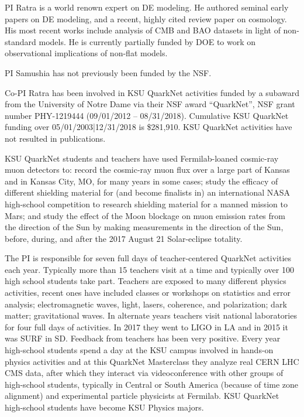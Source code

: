 PI Ratra is a world renown expert on DE modeling. He authored seminal early
papers on DE modeling, and a recent, highly cited review paper on cosmology.
His most recent works include analysis of CMB and BAO datasets in light of
non-standard models. He is currently partially funded by DOE to work on
observational implications of non-flat models.


PI Samushia has not previously been funded by the NSF.

Co-PI Ratra has been involved in  KSU QuarkNet activities funded by a subaward
from the University of Notre Dame via their NSF award ``QuarkNet'', NSF grant
number PHY-1219444 (09/01/2012 -- 08/31/2018).  Cumulative KSU QuarkNet funding
over 05/01/2003|12/31/2018 is \$281,910. KSU QuarkNet activities have not
resulted in publications. 

KSU QuarkNet students and teachers have used Fermilab-loaned cosmic-ray muon
detectors to: record the cosmic-ray muon flux over a large part of Kansas and
in Kansas City, MO, for many years in some cases; study the efficacy of
different shielding material for (and become finalists in) an international
NASA high-school competition to research shielding material for a manned
mission to Mars; and study the effect of the Moon blockage on muon emission
rates from the direction of the Sun by making measurements in the direction of
the Sun, before, during, and after the 2017 August 21 Solar-eclipse totality.

The PI is responsible for seven full days of teacher-centered QuarkNet
activities each year. Typically more than 15 teachers visit at a time and
typically over 100 high school students take part. Teachers are exposed to many
different physics activities, recent ones have included classes or workshops on
statistics and error analysis; electromagnetic waves, light, lasers, coherence,
and polarization; dark matter; gravitational waves.  In alternate years
teachers visit national laboratories for four full days of activities. In 2017
they went to LIGO in LA and in 2015 it was SURF in SD.  Feedback from teachers
has been very positive. Every year high-school students spend a day at the KSU
campus involved in hands-on physics activities and at this QuarkNet Masterclass
they analyze real CERN LHC CMS data, after which they interact via
videoconference with other groups of high-school students, typically in
Central or South America (because of time zone alignment) and experimental
particle physicists at Fermilab. KSU QuarkNet high-school students have become
KSU Physics majors. 


